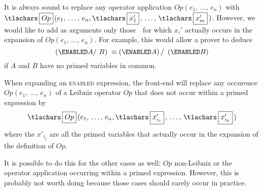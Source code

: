 \documentclass[11pt,fleqn]{article}
\newcommand{\B}{\begingroup\tlachars\BB}
\newcommand{\BB}[1]{\endgroup\,\fbox{\rule{0pt}{.7em}%
\let\tlacolon\midcolon\ensuremath{#1}}\,}
\newcommand{\oneto}[2]{\ensuremath{#1_{1},\,\ldots,\,#1_{#2}}}
\begin{document}
It is always sound to replace any operator application 
$Op(\oneto{e}{n})$ with 
   $\B{Op}(\oneto{e}{n}, \B{x_{1}'},\,\ldots,\, \B{x_{m}'})$.
However, we would like to add as arguments only those
\B{x'_{i}} for which $x_{i}'$ actually occurs in the expansion
of $Op(\oneto{e}{n})$.  For example, this would allow a prover
to deduce 
  \[ (\ENABLED A /\ B) \; \equiv (\ENABLED A) \, /\ \, (\ENABLED B)
 \]
if $A$ and $B$ have no primed variables in common.

When expanding an \textsc{enabled} expression, the front-end will
replace any occurence $Op(\oneto{e}{n})$ of a Leibniz operator $Op$
that does not occur within a primed expression by
  \[ \B{Op}(\oneto{e}{n}, \B{x_{i_{1}}'},\,\ldots,\, \B{x_{i_{k}}'})
  \]
where the $x'_{i_{j}}$ are all the primed variables that actually
occur in the expansion of the definition of $Op$.

It is possible to do this for the other cases as well: $Op$
non-Leibniz or the operator application occurring within a primed
expression.  However, this is probably not worth doing because those
cases should rarely occur in practice.
\end{document}
